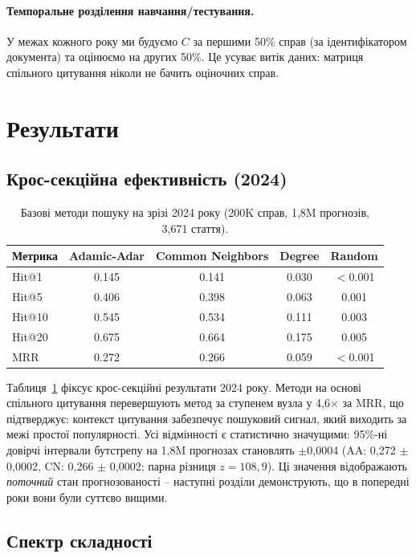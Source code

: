 \documentclass[11pt]{article}
\begin{document}
\paragraph{Темпоральне розділення навчання/тестування.}
У межах кожного року ми будуємо $C$ за першими 50\% справ (за ідентифікатором документа) та оцінюємо на других 50\%.
Це усуває витік даних: матриця спільного цитування ніколи не бачить оціночних справ.
\section{Результати}
\label{sec:results}

\subsection{Крос-секційна ефективність (2024)}

\begin{table}[t]
\centering
\small
\caption{Базові методи пошуку на зрізі 2024 року (200K справ, 1,8M прогнозів, 3{,}671 стаття).}
\label{tab:main}
\begin{tabular}{@{}l cccc@{}}
\toprule
\textbf{Метрика} & \textbf{Adamic-Adar} & \textbf{Common Neighbors} & \textbf{Degree} & \textbf{Random} \\
\midrule
Hit@1  & 0.145 & 0.141 & 0.030 & $<$0.001 \\
Hit@5  & 0.406 & 0.398 & 0.063 & 0.001 \\
Hit@10 & 0.545 & 0.534 & 0.111 & 0.003 \\
Hit@20 & 0.675 & 0.664 & 0.175 & 0.005 \\
MRR    & 0.272 & 0.266 & 0.059 & $<$0.001 \\
\bottomrule
\end{tabular}
\end{table}

Таблиця~\ref{tab:main} фіксує крос-секційні результати 2024 року.
Методи на основі спільного цитування перевершують метод за ступенем вузла у 4,6$\times$ за MRR, що підтверджує: контекст цитування забезпечує пошуковий сигнал, який виходить за межі простої популярності.
Усі відмінності є статистично значущими: 95\%-ні довірчі інтервали бутстрепу на 1,8M прогнозах становлять $\pm$0,0004 (AA: 0,272 $\pm$ 0,0002, CN: 0,266 $\pm$ 0,0002; парна різниця $z = 108{,}9$).
Ці значення відображають \emph{поточний} стан прогнозованості -- наступні розділи демонструють, що в попередні роки вони були суттєво вищими.

\subsection{Спектр складності}
\end{document}
